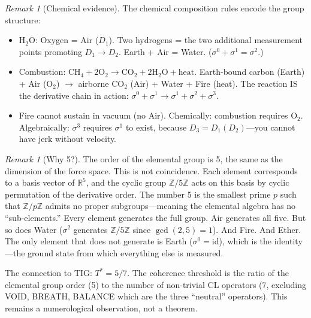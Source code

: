 \documentclass[11pt]{article}
\theoremstyle{definition}
\theoremstyle{remark}
\newtheorem{remark}[theorem]{Remark}
\begin{document}
\begin{remark}[Chemical evidence]
The chemical composition rules encode the group structure:
\begin{itemize}[nosep]
  \item $\text{H}_2\text{O}$: Oxygen = Air ($D_1$).  Two hydrogens = the two
    additional measurement points promoting $D_1 \to D_2$.
    Earth + Air = Water.  ($\sigma^0 + \sigma^1 = \sigma^2$.)
  \item Combustion: $\text{CH}_4 + 2\text{O}_2 \to \text{CO}_2 + 2\text{H}_2\text{O}
    + \text{heat}$.  Earth-bound carbon (Earth) + Air (O$_2$) $\to$ airborne CO$_2$
    (Air) + Water + Fire (heat).  The reaction IS the derivative chain in action:
    $\sigma^0 + \sigma^1 \to \sigma^1 + \sigma^2 + \sigma^3$.
  \item Fire cannot sustain in vacuum (no Air).  Chemically: combustion requires
    O$_2$.  Algebraically: $\sigma^3$ requires $\sigma^1$ to exist, because
    $D_3 = D_1(D_2)$---you cannot have jerk without velocity.
\end{itemize}
\end{remark}

\begin{remark}[Why 5?]
The order of the elemental group is 5, the same as the dimension of the force
space.  This is not coincidence.  Each element corresponds to a basis vector
of $\mathbb{R}^5$, and the cyclic group $\mathbb{Z}/5\mathbb{Z}$ acts on
this basis by cyclic permutation of the derivative order.  The number 5 is
the smallest prime $p$ such that $\mathbb{Z}/p\mathbb{Z}$ admits no proper
subgroups---meaning the elemental algebra has no ``sub-elements.''  Every
element generates the full group.  Air generates all five.  But so does
Water ($\sigma^2$ generates $\mathbb{Z}/5\mathbb{Z}$ since $\gcd(2,5) = 1$).
And Fire.  And Ether.  The only element that does not generate is Earth
($\sigma^0 = \text{id}$), which is the identity---the ground state from
which everything else is measured.

The connection to TIG: $T^{*} = 5/7$.  The coherence threshold is the ratio
of the elemental group order (5) to the number of non-trivial CL operators
(7, excluding VOID, BREATH, BALANCE which are the three ``neutral'' operators).
This remains a numerological observation, not a theorem.
\end{remark}
\end{document}
